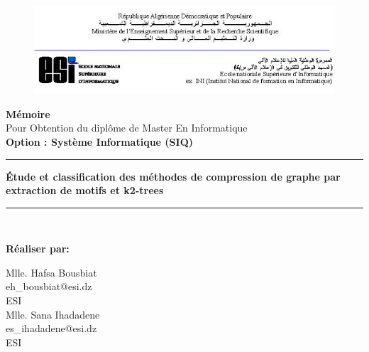 \begin{titlepage}





	\begin{figure}[t]
		\includegraphics[scale=0.75]{./ressources/image/ESI.png}\\[0.6in]
	\end{figure}
	
	
	
	\begin{center}
	
		\LARGE \textbf{ Mémoire}\\
		\Large{
			Pour Obtention du diplôme de Master En Informatique\\
			\textbf{Option : Système Informatique (SIQ)}
		}\\[0.2in]
		\huge {
		\rule{\linewidth}{.5pt}
			\textbf{
				Étude et classification des méthodes de compression de graphe par extraction de motifs et k2-trees
			} 
			\rule{\linewidth}{.5pt}
		}\\[0.5in]
		\Large
	
	\textbf{Réaliser par:}\\
	\begin{multicols}{2}
			\Large 	Mlle. Hafsa Bousbiat\\
			\large eh\_bousbiat@esi.dz\\
			ESI\\
		\columnbreak
 			\Large Mlle. Sana Ihadadene\\
			\large es\_ihadadene@esi.dz\\
			ESI \\
		

\end{multicols}
\end{center}
\end{titlepage}
